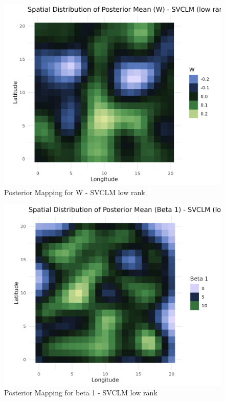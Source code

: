 \begin{figure}[ht]
 \centering
 \includegraphics[width=\textwidth]{../../figures/plot_A_SVCLM_LOW.png}
 \caption{Posterior Mapping for W - SVCLM low rank}
 \label{fig:SVCLMA}
 \end{figure}

 \begin{figure}[ht]
 \centering
 \includegraphics[width=\textwidth]{../../figures/plot_B_SVCLM_LOW.png}
 \caption{Posterior Mapping for beta 1 - SVCLM low rank}
 \label{fig:SVCLMAB}
 \end{figure}

